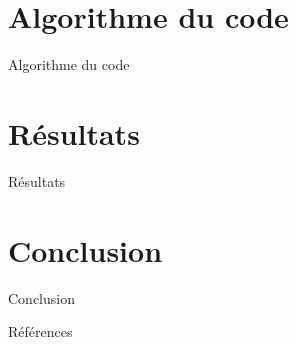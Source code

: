 \documentclass[aspectratio=169,xcolor=dvipsnames]{beamer}
\begin{document}
\section{Algorithme du code}
\begin{frame}{Algorithme du code}
\end{frame}

\section{Résultats}
\begin{frame}{Résultats}
    
\end{frame}

\section{Conclusion}
\begin{frame}{Conclusion}
\end{frame}

\begin{frame}{Références}
    \nocite{*}
    \printbibliography[title = Références]
\end{frame}
\end{document}
